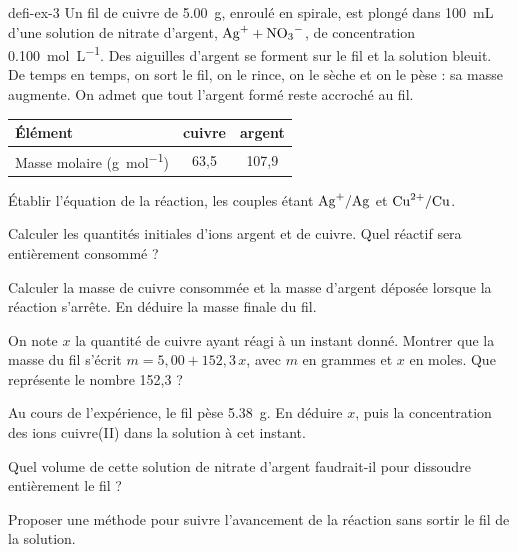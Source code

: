 \begin{blocEdition}{defi-ex-3}
Un fil de cuivre de \qty{5,00}{g}, enroulé en spirale, est plongé dans \qty{100}{mL} d'une solution de nitrate d'argent,
$\ce{Ag+}+\ce{NO3-}$, de concentration \qty{0,100}{mol.L^{-1}}. Des aiguilles d'argent se forment sur le fil et la solution bleuit. De
temps en temps, on sort le fil, on le rince, on le sèche et on le pèse : sa masse augmente. On admet que tout l'argent
formé reste accroché au fil.
\begin{center}
\begin{tabular}{lcc}
\toprule
Élément & cuivre & argent \\
\midrule
Masse molaire (\unit{g.mol^{-1}}) & 63,5 & 107,9 \\
\bottomrule
\end{tabular}
\end{center}
\begin{questions}
\item Établir l'équation de la réaction, les couples étant $\ce{Ag+}/\ce{Ag}$ et $\ce{Cu^{2+}}/\ce{Cu}$.
\item Calculer les quantités initiales d'ions argent et de cuivre. Quel réactif sera entièrement consommé ?
\item Calculer la masse de cuivre consommée et la masse d'argent déposée lorsque la réaction s'arrête. En déduire la masse
finale du fil.
\item On note $x$ la quantité de cuivre ayant réagi à un instant donné. Montrer que la masse du fil s'écrit
$m=5{,}00+152{,}3\,x$, avec $m$ en grammes et $x$ en moles. Que représente le nombre 152,3 ?
\item Au cours de l'expérience, le fil pèse \qty{5,38}{g}. En déduire $x$, puis la concentration des ions cuivre(II) dans la
solution à cet instant.
\item Quel volume de cette solution de nitrate d'argent faudrait-il pour dissoudre entièrement le fil ?
\item Proposer une méthode pour suivre l'avancement de la réaction sans sortir le fil de la solution.
\end{questions}
\end{blocEdition}

